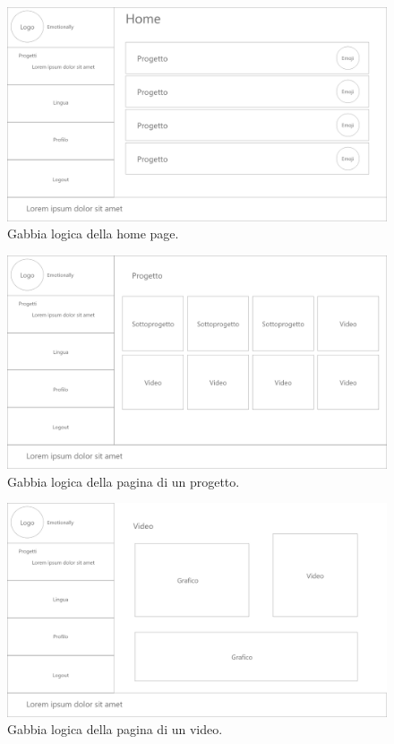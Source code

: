 \begin{figure}[H]
	\centering
	\caption{Gabbia logica della home page.}
	\label{fig:gabbie-logiche:home-page}
	\includegraphics[width=\textwidth]{images/gabbie-logiche/Home}
\end{figure}

\begin{figure}[H]
	\centering
	\caption{Gabbia logica della pagina di un progetto.}
	\label{fig:gabbie-logiche:project}
	\includegraphics[width=\textwidth]{images/gabbie-logiche/Progetto}
\end{figure}

\begin{figure}[H]
	\centering
	\caption{Gabbia logica della pagina di un video.}
	\label{fig:gabbie-logiche:video}
	\includegraphics[width=\textwidth]{images/gabbie-logiche/Video}
\end{figure}

